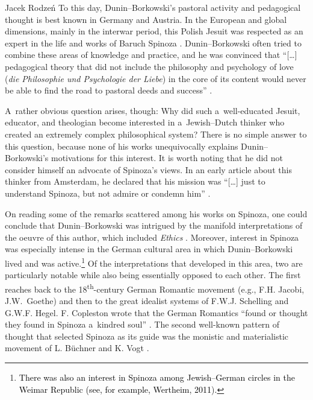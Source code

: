 \begin{artengenv}{Jacek Rodzeń}
To this day, Dunin–Borkowski's pastoral activity and pedagogical thought is best known in Germany and Austria. In the European and global dimensions, mainly in the interwar period, this Polish Jesuit was respected as an expert in the life and works of Baruch Spinoza
\parencite[cf.][p.139]{siwek_stanislaw_1935}. %
 Dunin–Borkowski often tried to combine these areas of knowledge and practice, and he was convinced that ``[…] pedagogical theory that did not include the philosophy and psychology of love (\textit{die Philosophie und Psychologie der Liebe}) in the core of its content would never be able to find the road to pastoral deeds and success'' 
\parencite[][p.43]{dunin-borkowski_autobiographie_1926}.%


A~rather obvious question arises, though: Why did such a~well-educated Jesuit, educator, and theologian become interested in a~Jewish–Dutch thinker who created an extremely complex philosophical system? There is no simple answer to this question, because none of his works unequivocally explains Dunin–Borkowski's motivations for this interest. It is worth noting that he did not consider himself an advocate of Spinoza's views. In an early article about this thinker from Amsterdam, he declared that his mission was ``[…] just to understand Spinoza, but not admire or condemn him''
\parencite[][p.126]{dunin-borkowski_leben_1902}.%


On reading some of the remarks scattered among his works on Spinoza, one could conclude that Dunin–Borkowski was intrigued by the manifold interpretations of the oeuvre of this author, which included \textit{Ethics}
\parencite[][p.30]{dunin-borkowski_junge_1910}. %
 Moreover, interest in Spinoza was especially intense in the German cultural area in which Dunin–Borkowski lived and was active.\footnote{\textcolor{black}{There was also an interest in Spinoza among Jewish–German circles in the Weimar Republic} \label{ref:RNDIm3uwTIgBl}\textcolor{black}{(see, for example, Wertheim, 2011})\textcolor{black}{.}} Of the interpretations that developed in this area, two are particularly notable while also being essentially opposed to each other. The first reaches back to the 18\textsuperscript{th}-century German Romantic movement (e.g., F.H. Jacobi, J.W.~Goethe) and then to the great idealist systems of F.W.J. Schelling and G.W.F. Hegel. F. Copleston wrote that the German Romantics ``found or thought they found in Spinoza a~kindred soul'' 
\parencite[][p.261]{copleston_history_1994}. %
 The second well-known pattern of thought that selected Spinoza as its guide was the monistic and materialistic movement of L. Büchner and K. Vogt 
\parencite[cf.][]{pawlicki_spinoza_1912}.%



\end{artengenv}
